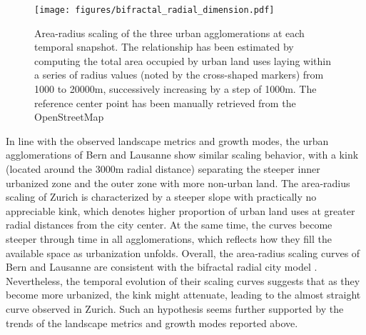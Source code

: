 \documentclass[10pt,letterpaper]{article}
\begin{document}
\begin{figure}[ht]
  \begin{adjustwidth}{-.4\textwidth}{0cm}
    \centering
    \texttt{[image: figures/bifractal\_radial\_dimension.pdf]}
    \vspace{.5em}
    \caption[Area-radius scaling]{\label{figures/bifractal_radial_dimension.pdf}Area-radius scaling of the three urban agglomerations at each temporal snapshot. The relationship has been estimated by computing the total area occupied by urban land uses laying within a series of radius values (noted by the cross-shaped markers) from 1000 to 20000m, successively increasing by a step of 1000m. The reference center point has been manually retrieved from the OpenStreetMap\footnotemark} %
  \end{adjustwidth}
\end{figure}


In line with the observed landscape metrics and growth modes, the urban agglomerations of Bern and Lausanne show similar scaling behavior, with a kink (located around the 3000m radial distance) separating the steeper inner urbanized zone and the outer zone with more non-urban land.
The area-radius scaling of Zurich is characterized by a steeper slope with practically no appreciable kink, which denotes higher proportion of urban land uses at greater radial distances from the city center.
At the same time, the curves become steeper through time in all agglomerations, which reflects how they fill the available space as urbanization unfolds.
Overall, the area-radius scaling curves of Bern and Lausanne are consistent with the bifractal radial city model \cite{white2015modeling}.
Nevertheless, the temporal evolution of their scaling curves suggests that as they become more urbanized, the kink might attenuate, leading to the almost straight curve observed in Zurich.
Such an hypothesis seems further supported by the trends of the landscape metrics and growth modes reported above.

\end{document}
